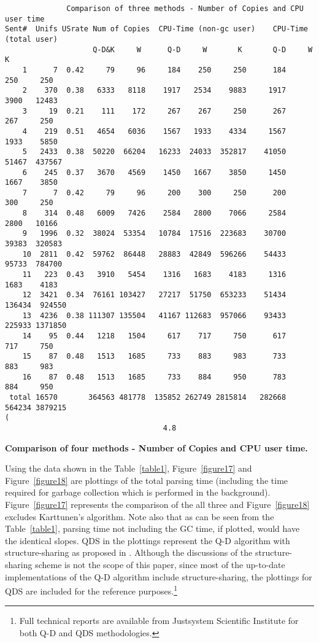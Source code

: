 \begin{table*}[htb]
\begin{small}
\begin{verbatim}
              Comparison of three methods - Number of Copies and CPU user time
Sent#  Unifs USrate Num of Copies  CPU-Time (non-gc user)    CPU-Time (total user)
                    Q-D&K     W      Q-D     W       K       Q-D     W       K     
    1      7  0.42     79     96     184    250     250      184     250     250
    2    370  0.38   6333   8118    1917   2534    9883     1917    3900   12483
    3     19  0.21    111    172     267    267     250      267     267     250   
    4    219  0.51   4654   6036    1567   1933    4334     1567    1933    5850
    5   2433  0.38  50220  66204   16233  24033  352817    41050   51467  437567
    6    245  0.37   3670   4569    1450   1667    3850     1450    1667    3850
    7      7  0.42     79     96     200    300     250      200     300     250
    8    314  0.48   6009   7426    2584   2800    7066     2584    2800   10166
    9   1996  0.32  38024  53354   10784  17516  223683    30700   39383  320583
    10  2811  0.42  59762  86448   28883  42849  596266    54433   95733  784700
    11   223  0.43   3910   5454    1316   1683    4183     1316    1683    4183
    12  3421  0.34  76161 103427   27217  51750  653233    51434  136434  924550
    13  4236  0.38 111307 135504   41167 112683  957066    93433  225933 1371850
    14    95  0.44   1218   1504     617    717     750      617     717     750
    15    87  0.48   1513   1685     733    883     983      733     883     983
    16    87  0.48   1513   1685     733    884     950      783     884     950
 total 16570       364563 481778  135852 262749 2815814   282668  564234 3879215
(
                                    4.8
\end{verbatim}
\end{small}
\caption{{\bf Comparison of four methods - Number of Copies and CPU
user time.}}
\label{table1}
\end{table*}


Using the data shown in the Table~\ref{table1}, Figure~\ref{figure17} and Figure~\ref{figure18} are
plottings of the total parsing time (including the time required for
garbage collection which is performed in the background).
Figure~\ref{figure17} represents the comparison of the all three and
Figure~\ref{figure18} excludes Karttunen's algorithm. Note also
that as can be seen from the Table~\ref{table1}, parsing time not including the
GC time, if plotted, would have the identical slopes. QDS in the
plottings represent the Q-D algorithm with structure-sharing as proposed
in \cite{quasi-str}. Although the discussions of the structure-sharing
scheme is not the scope of this paper, since most of the
up-to-date implementations of the Q-D algorithm include
structure-sharing, the plottings for QDS are included for the reference
purposes.\footnote{Full technical reports are available from
Justsystem Scientific Institute for both Q-D and QDS methodologies.}


